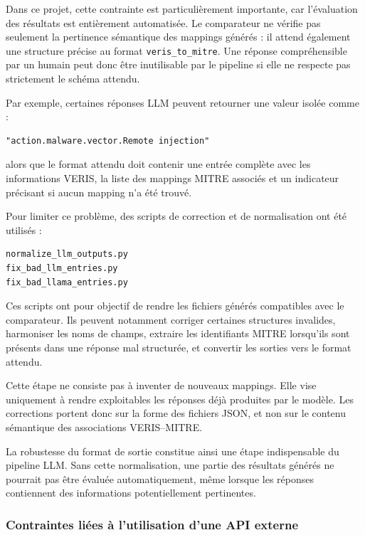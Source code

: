 \documentclass[a4paper,12pt]{article}
\begin{document}
Dans ce projet, cette contrainte est particulièrement importante, car l'évaluation des résultats est entièrement automatisée. Le comparateur ne vérifie pas seulement la pertinence sémantique des mappings générés : il attend également une structure précise au format \texttt{veris\_to\_mitre}. Une réponse compréhensible par un humain peut donc être inutilisable par le pipeline si elle ne respecte pas strictement le schéma attendu.

Par exemple, certaines réponses LLM peuvent retourner une valeur isolée comme :

\begin{verbatim}
"action.malware.vector.Remote injection"
\end{verbatim}

alors que le format attendu doit contenir une entrée complète avec les informations VERIS, la liste des mappings MITRE associés et un indicateur précisant si aucun mapping n'a été trouvé.

Pour limiter ce problème, des scripts de correction et de normalisation ont été utilisés :

\begin{verbatim}
normalize_llm_outputs.py
fix_bad_llm_entries.py
fix_bad_llama_entries.py
\end{verbatim}

Ces scripts ont pour objectif de rendre les fichiers générés compatibles avec le comparateur. Ils peuvent notamment corriger certaines structures invalides, harmoniser les noms de champs, extraire les identifiants MITRE lorsqu'ils sont présents dans une réponse mal structurée, et convertir les sorties vers le format attendu.

Cette étape ne consiste pas à inventer de nouveaux mappings. Elle vise uniquement à rendre exploitables les réponses déjà produites par le modèle. Les corrections portent donc sur la forme des fichiers JSON, et non sur le contenu sémantique des associations VERIS--MITRE.

La robustesse du format de sortie constitue ainsi une étape indispensable du pipeline LLM. Sans cette normalisation, une partie des résultats générés ne pourrait pas être évaluée automatiquement, même lorsque les réponses contiennent des informations potentiellement pertinentes.

\subsubsection{Contraintes liées à l'utilisation d'une API externe}
\end{document}
